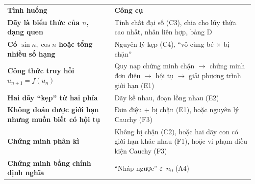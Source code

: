 \documentclass[11pt, a4paper, twoside]{article}
\newcommand{\eps}{\varepsilon}
\begin{document}
\vspace{0.5cm}
\begin{tcolorbox}[enhanced, breakable, colback=lightmain, colframe=maincolor, arc=4pt, boxrule=0.9pt, title={\bfseries\small GẶP DÃY SỐ, NÊN DÙNG CÔNG CỤ NÀO?}, coltitle=white, left=9pt, right=9pt]
\renewcommand{\arraystretch}{1.45}
\begin{tabularx}{\textwidth}{@{}>{\bfseries\color{maincolor}}L L@{}}
  \textbf{Tình huống} & \textbf{Công cụ}\\
  Dãy là biểu thức của $n$, dạng quen & Tính chất đại số (C3), chia cho lũy thừa cao nhất, nhân liên hợp, bảng D\\
  Có $\sin n,\cos n$ hoặc tổng nhiều số hạng & Nguyên lý kẹp (C4), ``vô cùng bé $\times$ bị chặn''\\
  Công thức truy hồi $u_{n+1}=f(u_n)$ & Quy nạp chứng minh chặn $\to$ chứng minh đơn điệu $\to$ hội tụ $\to$ giải phương trình giới hạn (E1)\\
  Hai dãy ``kẹp'' từ hai phía & Dãy kề nhau, đoạn lồng nhau (E2)\\
  Không đoán được giới hạn nhưng muốn biết có hội tụ & Đơn điệu + bị chặn (E1), hoặc nguyên lý Cauchy (F3)\\
  Chứng minh \textbf{phân kì} & Không bị chặn (C2), hoặc hai dãy con có giới hạn khác nhau (F1), hoặc vi phạm điều kiện Cauchy (F3)\\
  Chứng minh bằng chính định nghĩa & ``Nháp ngược'' $\eps$--$n_0$ (A4)\\
\end{tabularx}
\end{tcolorbox}
\newpage
\vspace{0.3cm}
\end{document}
